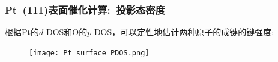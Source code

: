 \frame
{
	\frametitle{\textrm{Pt~(111)}表面催化计算:~投影态密度}

	根据\textrm{Pt}的$d$-\textrm{DOS}和\textrm{O}的$p$-DOS，可以定性地估计两种原子的成键的键强度:~\\
\begin{figure}[h!]
\centering
\texttt{[image: Pt\_surface\_PDOS.png]}
\caption{\fontsize{6.2pt}{5.2pt}}%
\label{Pt_surface_PDOS}
\end{figure}
}
